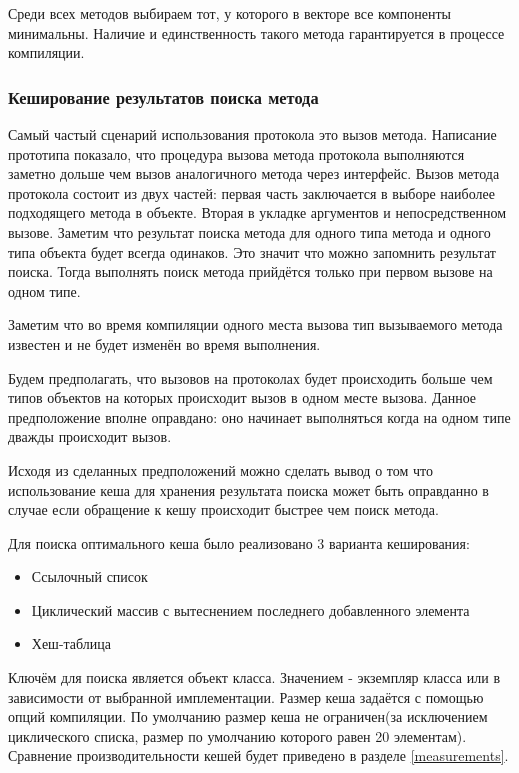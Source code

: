 Среди всех методов выбираем тот, у которого в векторе все компоненты минимальны. Наличие и единственность такого метода гарантируется в процессе компиляции.

\subsubsection{Кеширование результатов поиска метода}
Самый частый сценарий использования протокола это вызов метода. Написание прототипа показало, что процедура вызова метода протокола выполняются заметно дольше чем вызов аналогичного метода через интерфейс. Вызов метода протокола состоит из двух частей: первая часть заключается в выборе наиболее подходящего метода в объекте. Вторая в укладке аргументов и непосредственном вызове. Заметим что результат поиска метода для одного типа метода и одного типа объекта будет всегда одинаков. Это значит что можно запомнить результат поиска. Тогда выполнять поиск метода прийдётся только при первом вызове на одном типе.

Заметим что во время компиляции одного места вызова тип вызываемого метода известен и не будет изменён во время выполнения.

Будем предполагать, что вызовов на протоколах будет происходить больше чем типов объектов на которых происходит вызов в одном месте вызова. Данное предположение вполне оправдано: оно начинает выполняться когда на одном типе дважды происходит вызов.

Исходя из сделанных предположений можно сделать вывод о том что использование кеша для хранения результата поиска может быть оправданно в случае если обращение к кешу происходит быстрее чем поиск метода.

Для поиска оптимального кеша было реализовано 3 варианта кеширования:
\begin{itemize}
  \item Ссылочный список
  \item Циклический массив с вытеснением последнего добавленного элемента
  \item Хеш-таблица
\end{itemize}

Ключём для поиска является объект класса. Значением - экземпляр класса  или  в зависимости от выбранной имплементации. Размер кеша задаётся с помощью опций компиляции. По умолчанию размер кеша не ограничен(за исключением циклического списка, размер по умолчанию которого равен 20 элементам). Сравнение производительности кешей будет приведено в разделе \ref{measurements}.

